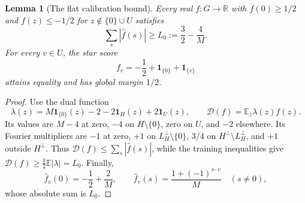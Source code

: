\documentclass[11pt]{article}
\newtheorem{lemma}[theorem]{Lemma}
\newcommand{\R}{\mathbb R}
\newcommand{\E}{\mathbb E}
\newcommand{\one}{\mathbf 1}
\begin{document}
\begin{lemma}[The flat calibration bound]\label{lem:flat}
Every real $f:G\to\R$ with $f(0)\ge1/2$ and
$f(z)\le-1/2$ for $z\notin\{0\}\cup U$ satisfies
\begin{equation}\label{eq:flatlower}
 \sum_s|\widehat f(s)|\ge L_0:=\frac32-\frac4M.
\end{equation}
For every $v\in U$, the star score
\begin{equation}\label{eq:starscore}
 f_v=-\frac12+\one_{\{0\}}+\one_{\{v\}}
\end{equation}
attains equality and has global margin $1/2$.
\end{lemma}
\begin{proof}
Use the dual function
\[
 \lambda(z)=M\one_{\{0\}}(z)-2-2\one_H(z)+2\one_U(z),
 \qquad \mathcal D(f)=\E_z\lambda(z)f(z).
\]
Its values are $M-4$ at zero, $-4$ on $H\setminus\{0\}$, zero
on $U$, and $-2$ elsewhere. Its Fourier multipliers are $-1$ at
zero, $+1$ on $L_H^\perp\setminus\{0\}$, $3/4$ on
$H^\perp\setminus L_H^\perp$, and $+1$ outside $H^\perp$.
Thus $\mathcal D(f)\le\sum_s|\widehat f(s)|$, while the training
inequalities give $\mathcal D(f)\ge\frac12\E|\lambda|=L_0$.
Finally,
\[
 \widehat f_v(0)=-\frac12+\frac2M,
 \qquad
 \widehat f_v(s)=\frac{1+(-1)^{s\cdot v}}M\quad(s\ne0),
\]
whose absolute sum is $L_0$.
\end{proof}
\end{document}
